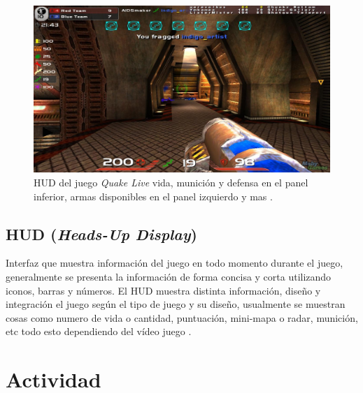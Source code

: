 \begin{figure}
\includegraphics[width=\linewidth]{semana8/quake_live.jpg} 
\caption{HUD del juego \emph{Quake Live} vida, munición y defensa en el panel inferior, armas disponibles en el panel izquierdo y mas \cite{quake_live}.}
\end{figure}
\subsection{HUD (\emph{Heads-Up Display})}
Interfaz que muestra información del juego en todo momento durante el juego, generalmente se presenta la información de forma concisa y corta utilizando iconos, barras y números. El HUD muestra distinta información, diseño y integración el juego según el tipo de juego y su diseño, usualmente se muestran cosas como numero de vida o cantidad, puntuación, mini-mapa o radar, munición, etc todo esto dependiendo del vídeo juego \cite{huds}.

\section{Actividad}
